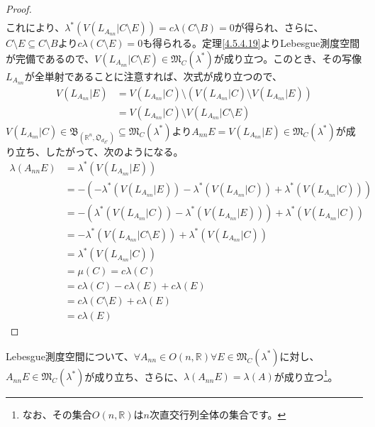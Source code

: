 \documentclass[dvipdfmx]{jsarticle}
\begin{document}
\begin{proof}
\begin{align*}
\end{align*}
これにより、$\lambda^{*}\left( V\left( L_{A_{nn}}|C \setminus E \right) \right) = c\lambda(C \setminus B) = 0$が得られ、さらに、$C \setminus E \subseteq C \setminus B$より$c\lambda(C \setminus E) = 0$も得られる。定理\ref{4.5.4.19}よりLebesgue測度空間が完備であるので、$V\left( L_{A_{nn}}|C \setminus E \right) \in \mathfrak{M}_{C}\left( \lambda^{*} \right)$が成り立つ。このとき、その写像$L_{A_{nn}}$が全単射であることに注意すれば、次式が成り立つので、
\begin{align*}
V\left( L_{A_{nn}}|E \right) &= V\left( L_{A_{nn}}|C \right) \setminus \left( V\left( L_{A_{nn}}|C \right) \setminus V\left( L_{A_{nn}}|E \right) \right)\\
&= V\left( L_{A_{nn}}|C \right) \setminus V\left( L_{A_{nn}}|C \setminus E \right)
\end{align*}
$V\left( L_{A_{nn}}|C \right) \in \mathfrak{B}_{\left( \mathbb{R}^{n},\mathfrak{O}_{d_{E^{n}}} \right)} \subseteq \mathfrak{M}_{C}\left( \lambda^{*} \right)$より$A_{nn}E = V\left( L_{A_{nn}}|E \right) \in \mathfrak{M}_{C}\left( \lambda^{*} \right)$が成り立ち、したがって、次のようになる。
\begin{align*}
\lambda\left( A_{nn}E \right) &= \lambda^{*}\left( V\left( L_{A_{nn}}|E \right) \right)\\
&= - \left( - \lambda^{*}\left( V\left( L_{A_{nn}}|E \right) \right) - \lambda^{*}\left( V\left( L_{A_{nn}}|C \right) \right) + \lambda^{*}\left( V\left( L_{A_{nn}}|C \right) \right) \right)\\
&= - \left( \lambda^{*}\left( V\left( L_{A_{nn}}|C \right) \right) - \lambda^{*}\left( V\left( L_{A_{nn}}|E \right) \right) \right) + \lambda^{*}\left( V\left( L_{A_{nn}}|C \right) \right)\\
&= - \lambda^{*}\left( V\left( L_{A_{nn}}|C \setminus E \right) \right) + \lambda^{*}\left( V\left( L_{A_{nn}}|C \right) \right)\\
&= \lambda^{*}\left( V\left( L_{A_{nn}}|C \right) \right)\\
&= \mu(C) = c\lambda(C)\\
&= c\lambda(C) - c\lambda(E) + c\lambda(E)\\
&= c\lambda(C \setminus E) + c\lambda(E)\\
&= c\lambda(E)
\end{align*}
\end{proof}
\begin{thm}\label{4.5.4.21}
Lebesgue測度空間について、$\forall A_{nn} \in O\left( n,\mathbb{R} \right)\forall E \in \mathfrak{M}_{C}\left( \lambda^{*} \right)$に対し、$A_{nn}E \in \mathfrak{M}_{C}\left( \lambda^{*} \right)$が成り立ち、さらに、$\lambda\left( A_{nn}E \right) = \lambda(A)$が成り立つ\footnote{なお、その集合$O\left( n,\mathbb{R} \right)$は$n$次直交行列全体の集合です。}。
\end{thm}
\end{document}
